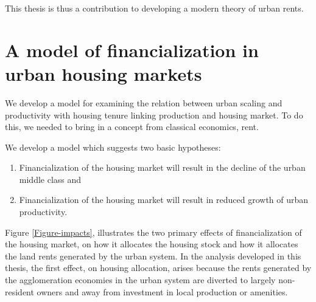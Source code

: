 This thesis  is thus a contribution to developing a modern theory of urban rents.









\section{A model of financialization in urban housing markets}
We  develop a model for examining the relation between urban scaling and productivity with housing tenure linking production  and housing market. To do this, we needed to bring in a concept from classical economics, rent.  %

We develop a model which suggests two basic hypotheses:
\begin{enumerate}
    \item Financialization of the housing market will result in the decline of the urban middle class and
    \item Financialization of the housing market will result in reduced growth of urban productivity.
\end{enumerate} 

Figure \ref{Figure-impacts}, illustrates the two primary effects of financialization of the housing market, on how it allocates %
the housing stock and how it allocates the land \glspl{rent} generated by the urban system. %
In the analysis developed in this thesis, %
the first effect, on housing allocation, arises because the rents generated by the agglomeration economies in the urban system are diverted to largely non-resident owners and away from investment in local production or amenities. 

